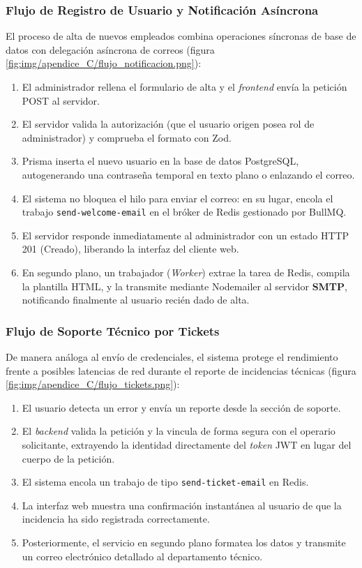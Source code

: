 \subsubsection{Flujo de Registro de Usuario y Notificación Asíncrona}
El proceso de alta de nuevos empleados combina operaciones síncronas de base de datos con delegación asíncrona de correos (figura \ref{fig:img/apendice_C/flujo_notificacion.png}):
\begin{enumerate}
    \item El administrador rellena el formulario de alta y el \textit{frontend} envía la petición POST al servidor.
    \item El servidor valida la autorización (que el usuario origen posea rol de administrador) y comprueba el formato con Zod.
    \item Prisma inserta el nuevo usuario en la base de datos PostgreSQL, autogenerando una contraseña temporal en texto plano o enlazando el correo.
    \item El sistema no bloquea el hilo para enviar el correo: en su lugar, encola el trabajo \texttt{send-welcome-email} en el bróker de Redis gestionado por BullMQ.
    \item El servidor responde inmediatamente al administrador con un estado HTTP 201 (Creado), liberando la interfaz del cliente web.
    \item En segundo plano, un trabajador (\textit{Worker}) extrae la tarea de Redis, compila la plantilla HTML, y la transmite mediante Nodemailer al servidor \textbf{SMTP}, notificando finalmente al usuario recién dado de alta.
\end{enumerate}


\subsubsection{Flujo de Soporte Técnico por Tickets}
De manera análoga al envío de credenciales, el sistema protege el rendimiento frente a posibles latencias de red durante el reporte de incidencias técnicas (figura \ref{fig:img/apendice_C/flujo_tickets.png}):
\begin{enumerate}
    \item El usuario detecta un error y envía un reporte desde la sección de soporte.
    \item El \textit{backend} valida la petición y la vincula de forma segura con el operario solicitante, extrayendo la identidad directamente del \textit{token} JWT en lugar del cuerpo de la petición.
    \item El sistema encola un trabajo de tipo \texttt{send-ticket-email} en Redis.
    \item La interfaz web muestra una confirmación instantánea al usuario de que la incidencia ha sido registrada correctamente.
    \item Posteriormente, el servicio en segundo plano formatea los datos y transmite un correo electrónico detallado al departamento técnico.
\end{enumerate}


